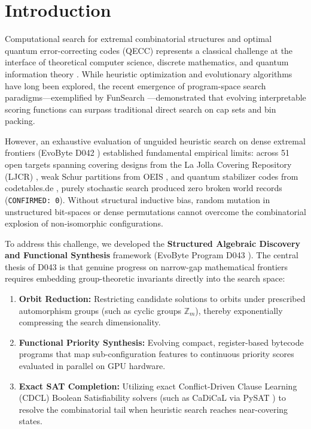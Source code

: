 \documentclass[11pt,a4paper]{article}
\begin{document}
\section{Introduction}
\label{sec:intro}
Computational search for extremal combinatorial structures and optimal quantum error-correcting codes (QECC) represents a classical challenge at the interface of theoretical computer science, discrete mathematics, and quantum information theory \cite{mills1979sqs, gottesman1996stabilizer, calderbank1998quantum}. While heuristic optimization and evolutionary algorithms have long been explored, the recent emergence of program-space search paradigms---exemplified by FunSearch \cite{romeraparedes2024nature}---demonstrated that evolving interpretable scoring functions can surpass traditional direct search on cap sets and bin packing.

However, an exhaustive evaluation of unguided heuristic search on dense extremal frontiers (EvoByte D042 \cite{zanata2026frontier}) established fundamental empirical limits: across 51 open targets spanning covering designs from the La Jolla Covering Repository (LJCR) \cite{gordon2026ljcr}, weak Schur partitions from OEIS \cite{oeis2026a066010}, and quantum stabilizer codes from codetables.de \cite{grassl2026codetables}, purely stochastic search produced zero broken world records (\texttt{CONFIRMED: 0}). Without structural inductive bias, random mutation in unstructured bit-spaces or dense permutations cannot overcome the combinatorial explosion of non-isomorphic configurations.

To address this challenge, we developed the \textbf{Structured Algebraic Discovery and Functional Synthesis} framework (EvoByte Program D043 \cite{zanata2026evobyte}). The central thesis of D043 is that genuine progress on narrow-gap mathematical frontiers requires embedding group-theoretic invariants directly into the search space:
\begin{enumerate}
    \item \textbf{Orbit Reduction:} Restricting candidate solutions to orbits under prescribed automorphism groups (such as cyclic groups $\mathbb{Z}_m$), thereby exponentially compressing the search dimensionality.
    \item \textbf{Functional Priority Synthesis:} Evolving compact, register-based bytecode programs that map sub-configuration features to continuous priority scores evaluated in parallel on GPU hardware.
    \item \textbf{Exact SAT Completion:} Utilizing exact Conflict-Driven Clause Learning (CDCL) Boolean Satisfiability solvers (such as CaDiCaL \cite{biere2020cadical} via PySAT \cite{ignatiev2018pysat}) to resolve the combinatorial tail when heuristic search reaches near-covering states.
\end{enumerate}
\end{document}
